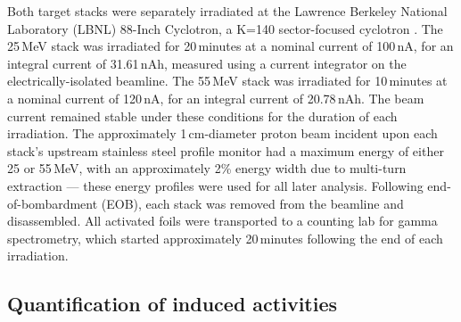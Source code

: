 Both target stacks were 
separately irradiated at the  Lawrence Berkeley National Laboratory  (LBNL)
88-Inch Cyclotron, a  K=140 sector-focused cyclotron \cite{7999622}.
The 25\,MeV stack was irradiated for 
20\,minutes at a nominal current of 100\,nA,  for an  integral current of 31.61\,nAh, measured using a current integrator on the electrically-isolated beamline. 
The 55\,MeV stack was irradiated for 
10\,minutes at a nominal current of 120\,nA,  for an  integral current of 20.78\,nAh. 
The beam current
remained stable under these conditions for the duration of each irradiation.
The approximately 1\,cm-diameter proton beam incident upon each stack's upstream stainless steel profile monitor had a maximum energy of either 25 or 55\,MeV, with an approximately 2\% energy width due to multi-turn extraction --- these energy profiles were used for all later analysis.
Following end-of-bombardment (EOB), each stack was removed from the beamline and disassembled.
All activated foils were transported to a counting lab for gamma spectrometry, which started approximately 20\,minutes following the end of each irradiation.





\subsection{\label{sec:spectroscopy_fe}Quantification of induced activities}


